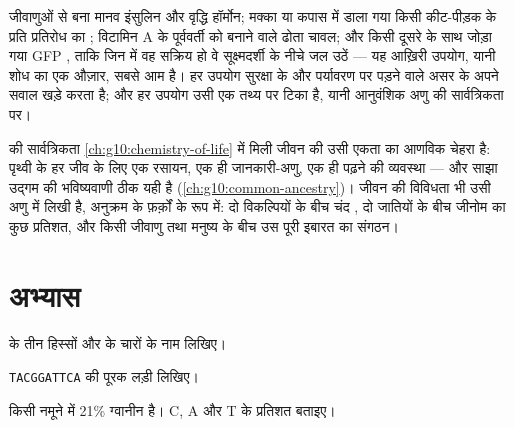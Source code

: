 \begin{example}[पारजीनन के उपयोग]\label{ex:g10:universal-dna:uses}
जीवाणुओं से बना मानव इंसुलिन और वृद्धि हॉर्मोन; मक्का या कपास में डाला
गया किसी कीट-पीड़क के प्रति प्रतिरोध का ; विटामिन A के पूर्ववर्ती को
बनाने वाले  ढोता चावल; और किसी दूसरे  के साथ जोड़ा गया GFP ,
ताकि जिन  में वह  सक्रिय हो वे सूक्ष्मदर्शी के नीचे जल उठें
--- यह आख़िरी उपयोग, यानी शोध का एक औज़ार, सबसे आम है। हर उपयोग सुरक्षा
के और पर्यावरण पर पड़ने वाले असर के अपने सवाल खड़े करता है; और हर उपयोग
उसी एक तथ्य पर टिका है, यानी आनुवंशिक अणु की सार्वत्रिकता पर।
\end{example}

\begin{remark}[अणुओं के स्तर पर एकता और विविधता]\label{rem:g10:universal-dna:unity}
 की सार्वत्रिकता \cref{ch:g10:chemistry-of-life} में मिली जीवन की उसी
एकता का आणविक चेहरा है: पृथ्वी के हर जीव के लिए एक रसायन, एक ही
जानकारी-अणु, एक ही पढ़ने की व्यवस्था --- और साझा उद्गम की भविष्यवाणी ठीक
यही है (\cref{ch:g10:common-ancestry})। जीवन की विविधता भी उसी अणु में
लिखी है, अनुक्रम के फ़र्क़ों के रूप में: दो विकल्पियों के बीच चंद ,
दो जातियों के बीच जीनोम का कुछ प्रतिशत, और किसी जीवाणु तथा मनुष्य के बीच
उस पूरी इबारत का संगठन।
\end{remark}

\section{अभ्यास}

\begin{exercise}[$\star$]\label{exo:g10:universal-dna:1}
 के तीन हिस्सों और  के चारों  के नाम लिखिए।
\end{exercise}

\begin{exercise}[$\star$]\label{exo:g10:universal-dna:2}
\texttt{TACGGATTCA} की पूरक लड़ी लिखिए।
\end{exercise}

\begin{exercise}[$\star$]\label{exo:g10:universal-dna:3}
किसी  नमूने में 21\% ग्वानीन है। C, A और T के प्रतिशत बताइए।
\end{exercise}

